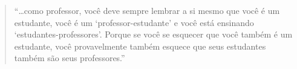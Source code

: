 

\cleartoverso

\begin{quote}
“…como professor, você deve sempre lembrar a si mesmo que você é um
estudante, você é um ‘professor-estudante’ e você está ensinando
‘estudantes-professores’. Porque se você se esquecer que você também é
um estudante, você provavelmente também esquece que seus estudantes
também são seus professores.”
\end{quote}

